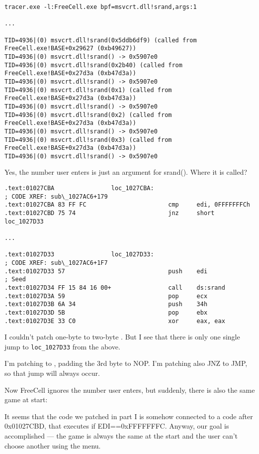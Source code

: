 \begin{lstlisting}
tracer.exe -l:FreeCell.exe bpf=msvcrt.dll!srand,args:1

...

TID=4936|(0) msvcrt.dll!srand(0x5ddb6df9) (called from FreeCell.exe!BASE+0x29627 (0xb49627))
TID=4936|(0) msvcrt.dll!srand() -> 0x5907e0
TID=4936|(0) msvcrt.dll!srand(0x2b40) (called from FreeCell.exe!BASE+0x27d3a (0xb47d3a))
TID=4936|(0) msvcrt.dll!srand() -> 0x5907e0
TID=4936|(0) msvcrt.dll!srand(0x1) (called from FreeCell.exe!BASE+0x27d3a (0xb47d3a))
TID=4936|(0) msvcrt.dll!srand() -> 0x5907e0
TID=4936|(0) msvcrt.dll!srand(0x2) (called from FreeCell.exe!BASE+0x27d3a (0xb47d3a))
TID=4936|(0) msvcrt.dll!srand() -> 0x5907e0
TID=4936|(0) msvcrt.dll!srand(0x3) (called from FreeCell.exe!BASE+0x27d3a (0xb47d3a))
TID=4936|(0) msvcrt.dll!srand() -> 0x5907e0
\end{lstlisting}

Yes, the number user enters is just an argument for srand().
Where it is called?

\begin{lstlisting}
.text:01027CBA                loc_1027CBA:                            ; CODE XREF: sub\_1027AC6+179
.text:01027CBA 83 FF FC                       cmp     edi, 0FFFFFFFCh
.text:01027CBD 75 74                          jnz     short loc_1027D33

...

.text:01027D33                loc_1027D33:                            ; CODE XREF: sub\_1027AC6+1F7
.text:01027D33 57                             push    edi             ; Seed
.text:01027D34 FF 15 84 16 00+                call    ds:srand
.text:01027D3A 59                             pop     ecx
.text:01027D3B 6A 34                          push    34h
.text:01027D3D 5B                             pop     ebx
.text:01027D3E 33 C0                          xor     eax, eax
\end{lstlisting}

I couldn't patch one-byte  to two-byte .
But I see that there is only one single jump to \verb|loc_1027D33| from the above.

I'm patching  to , padding the 3rd byte to \ac{NOP}.
I'm patching also JNZ to JMP, so that jump will always occur.

Now FreeCell ignores the number user enters, but suddenly, there is also the same game at start:

\begin{figure}[H]
\centering
{}
\end{figure}

It seems that the code we patched in part I is somehow connected to a code after 0x01027CBD, that executes if EDI==0xFFFFFFFC.
Anyway, our goal is accomplished --- the game is always the same at the start and the user can't choose another using the menu.
